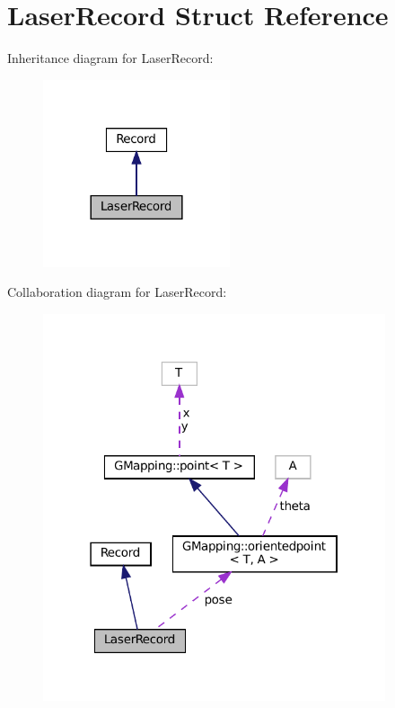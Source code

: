 \hypertarget{structLaserRecord}{}\section{Laser\+Record Struct Reference}
\label{structLaserRecord}


Inheritance diagram for Laser\+Record\+:
\nopagebreak
\begin{figure}[H]
\begin{center}
\leavevmode
\includegraphics[width=156pt]{structLaserRecord__inherit__graph}
\end{center}
\end{figure}


Collaboration diagram for Laser\+Record\+:
\nopagebreak
\begin{figure}[H]
\begin{center}
\leavevmode
\includegraphics[width=286pt]{structLaserRecord__coll__graph}
\end{center}
\end{figure}
